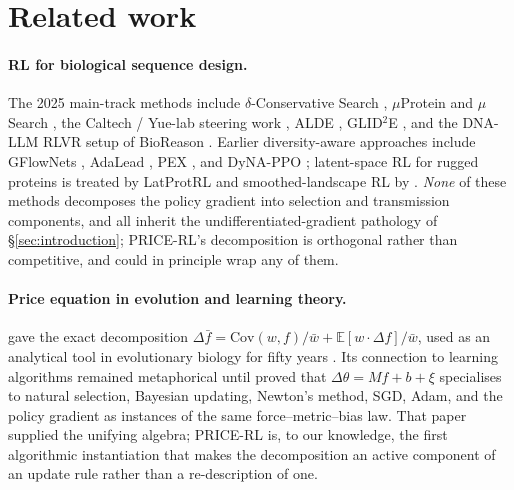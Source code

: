 \section{Related work}
\label{sec:related}

\paragraph{RL for biological sequence design.} The 2025 main-track methods include $\delta$-Conservative Search \citep{kim2025deltacs}, $\mu$Protein and $\mu$Search \citep{sun2025muprotein}, the Caltech / Yue-lab steering work \citep{yang2025steering}, ALDE \citep{yang2025alde}, GLID$^2$E \citep{cao2025glid2e}, and the DNA-LLM RLVR setup of BioReason \citep{bioreason2025}. Earlier diversity-aware approaches include GFlowNets \citep{jain2022biological}, AdaLead \citep{sinai2020adalead}, PEX \citep{ren2022proximal}, and DyNA-PPO \citep{angermueller2020dyna}; latent-space RL for rugged proteins is treated by LatProtRL \citep{lee2024latprotrl} and smoothed-landscape RL by \citet{kirjner2024smoothed}. \emph{None} of these methods decomposes the policy gradient into selection and transmission components, and all inherit the undifferentiated-gradient pathology of §\ref{sec:introduction}; PRICE-RL's decomposition is orthogonal rather than competitive, and could in principle wrap any of them.

\paragraph{Price equation in evolution and learning theory.} \citet{price1970selection} gave the exact decomposition $\Delta\bar f = \mathrm{Cov}(w,f)/\bar w + \mathbb{E}[w \cdot \Delta f]/\bar w$, used as an analytical tool in evolutionary biology for fifty years \citep{frank2012natural}. Its connection to learning algorithms remained metaphorical until \citet{frank2025price} proved that $\Delta\theta = M f + b + \xi$ specialises to natural selection, Bayesian updating, Newton's method, SGD, Adam, and the policy gradient as instances of the same force--metric--bias law. That paper supplied the unifying algebra; PRICE-RL is, to our knowledge, the first algorithmic instantiation that makes the decomposition an active component of an update rule rather than a re-description of one.

